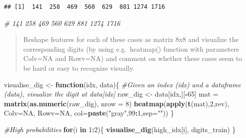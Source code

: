 \documentclass[
]{article}
\newenvironment{Shaded}{\begin{snugshade}}{\end{snugshade}}
\newcommand{\AttributeTok}[1]{\textcolor[rgb]{0.13,0.29,0.53}{#1}}
\newcommand{\CommentTok}[1]{\textcolor[rgb]{0.56,0.35,0.01}{\textit{#1}}}
\newcommand{\ConstantTok}[1]{\textcolor[rgb]{0.56,0.35,0.01}{#1}}
\newcommand{\ControlFlowTok}[1]{\textcolor[rgb]{0.13,0.29,0.53}{\textbf{#1}}}
\newcommand{\DecValTok}[1]{\textcolor[rgb]{0.00,0.00,0.81}{#1}}
\newcommand{\FunctionTok}[1]{\textcolor[rgb]{0.13,0.29,0.53}{\textbf{#1}}}
\newcommand{\NormalTok}[1]{#1}
\newcommand{\OtherTok}[1]{\textcolor[rgb]{0.56,0.35,0.01}{#1}}
\newcommand{\SpecialCharTok}[1]{\textcolor[rgb]{0.81,0.36,0.00}{\textbf{#1}}}
\newcommand{\StringTok}[1]{\textcolor[rgb]{0.31,0.60,0.02}{#1}}
\begin{document}
\begin{verbatim}
## [1]  141  258  469  560  629  881 1274 1716
\end{verbatim}

\begin{Shaded}
\begin{Highlighting}[]
\CommentTok{\# 141  258  469  560  629  881 1274 1716}
\end{Highlighting}
\end{Shaded}

\begin{quote}
Reshape features for each of these cases as matrix 8x8 and visualize the
corresponding digits (by using e.g.~heatmap() function with parameters
Colv=NA and Rowv=NA) and comment on whether these cases seem to be hard
or easy to recognize visually.
\end{quote}

\begin{Shaded}
\begin{Highlighting}[]
\NormalTok{visualise\_dig }\OtherTok{\textless{}{-}} \ControlFlowTok{function}\NormalTok{(idx, data)\{}
  \CommentTok{\#Given an index (idx) and a dataframe (data), visualize the digit at data[idx]}
\NormalTok{  raw\_dig }\OtherTok{\textless{}{-}}\NormalTok{ data[idx,][}\SpecialCharTok{{-}}\DecValTok{65}\NormalTok{]}
\NormalTok{  mat }\OtherTok{=} \FunctionTok{matrix}\NormalTok{(}\FunctionTok{as.numeric}\NormalTok{(raw\_dig), }\AttributeTok{nrow =} \DecValTok{8}\NormalTok{)}
  \FunctionTok{heatmap}\NormalTok{(}\FunctionTok{apply}\NormalTok{(}\FunctionTok{t}\NormalTok{(mat),}\DecValTok{2}\NormalTok{,rev), }\AttributeTok{Colv=}\ConstantTok{NA}\NormalTok{, }\AttributeTok{Rowv=}\ConstantTok{NA}\NormalTok{, }\AttributeTok{col=}\FunctionTok{paste}\NormalTok{(}\StringTok{"gray"}\NormalTok{,}\DecValTok{99}\SpecialCharTok{:}\DecValTok{1}\NormalTok{,}\AttributeTok{sep=}\StringTok{""}\NormalTok{))}
\NormalTok{\}}
\end{Highlighting}
\end{Shaded}

\begin{Shaded}
\begin{Highlighting}[]
\CommentTok{\#High probabilities}
\ControlFlowTok{for}\NormalTok{(i }\ControlFlowTok{in} \DecValTok{1}\SpecialCharTok{:}\DecValTok{2}\NormalTok{)\{}
  \FunctionTok{visualise\_dig}\NormalTok{(high\_idx[i], digits\_train)}
\NormalTok{\}}
\end{Highlighting}
\end{Shaded}
\end{document}
